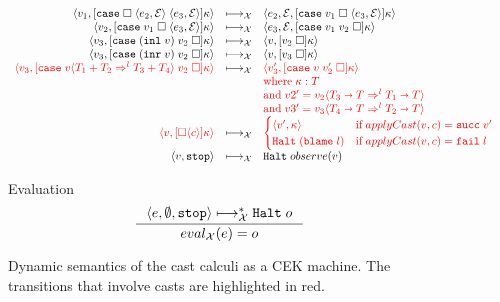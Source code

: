 \documentclass[acmsmall,review]{acmart}\settopmatter{printfolios=true,printccs=false,printacmref=false}
\newcommand{\plus}[0]{+}
\newcommand{\sOOinspect}[3]{\langle#1,#2,#3\rangle}
\newcommand{\sOOreturn}[2]{\langle#1,#2\rangle}
\newcommand{\sOOhalt}[1]{\mathtt{Halt} \; #1}
\newcommand{\POOfun}[2]{#1 \shortrightarrow #2}
\newcommand{\POOprod}[2]{#1 \times #2}
\newcommand{\POOsum}[2]{#1 \plus #2}
\newcommand{\cOOcast}[3]{#1 \Rightarrow^{#2} #3}
\newcommand{\oOOblame}[1]{\mathtt{blame} \; #1}
\newcommand{\vOOcast}[2]{#1\langle#2\rangle}
\newcommand{\vOOinl}[1]{\mathtt{inl}\;#1}
\newcommand{\vOOinr}[1]{\mathtt{inr}\;#1}
\newcommand{\rOOsucc}[1]{\mathtt{succ}\;#1}
\newcommand{\rOOfail}[1]{\mathtt{fail}\;#1}
\newcommand{\kOOmt}[0]{\mathtt{stop}}
\newcommand{\kOOconsI}[5]{
	[\mathtt{cons}^{\POOprod{#1}{#2}} \; \square \; \langle#3,#4\rangle ]#5}
\newcommand{\kOOappII}[2]{
  [#1 \; \square]#2}
\newcommand{\kOOcaseI}[4]{
  [\mathtt{case} \; \square \; \langle#1,#3\rangle \; \langle#2,#3\rangle ]#4}
\newcommand{\kOOcaseII}[4]{
  [\mathtt{case} \; #1 \; \square \; \langle#2,#3\rangle ]#4}
\newcommand{\kOOcaseIII}[3]{
  [\mathtt{case} \; #1 \; #2 \; \square]#3}
\newcommand{\kOOcast}[2]{
  [\square \langle #1 \rangle]#2}
\newcommand{\hckOOmt}[0]{\mathtt{stop}}
\newcommand{\sidecond}[1]{\text{if}\;#1}
\newcommand{\judgeCreduceTrans}[2]{#1 \longmapsto_{\mathcal{X}}^{*} #2}
\newcommand{\judgeCeval}[2]{eval_{\mathcal{X}}(#1) = #2}
\newcommand{\redrule}[3]{#1 & \longmapsto_\mathcal{X} & #2 & #3\\}
\newcommand{\highlight}[1]{{\color{red} #1}}
\begin{document}
\begin{figure}
\[\begin{array}{rclr}
\redrule{
\sOOreturn{v_1}{\kOOcaseI{e_2}{e_3}{\mathcal{E}}{\kappa}}}{
\sOOinspect{e_2}{\mathcal{E}}{\kOOcaseII{v_1}{e_3}{\mathcal{E}}{\kappa}}}{}

\redrule{
\sOOreturn{v_2}{\kOOcaseII{v_1}{e_3}{\mathcal{E}}{\kappa}}}{
\sOOinspect{e_3}{\mathcal{E}}{
  \kOOcaseIII{v_1}{v_2}{\kappa}
}}{}  

\redrule{
\sOOreturn{v_3}{
  \kOOcaseIII{(\vOOinl{v})}{v_2}{\kappa}
}
}{
\sOOreturn{v}{\kOOappII{v_2}{\kappa}}
}{}

\redrule{
  \sOOreturn{v_3}{
    \kOOcaseIII{(\vOOinr{v})}{v_2}{\kappa}
  }
}{
\sOOreturn{v}{\kOOappII{v_3}{\kappa}}
}{}

\redrule{
  \highlight{\sOOreturn{v_3}{
    \kOOcaseIII{
        \vOOcast{v}{\cOOcast{\POOsum{T_1}{T_2}}{l}{\POOsum{T_3}{T_4}}}
      }{v_2}{\kappa}
  }}
}{
  \highlight{\sOOreturn{v_3'}{
      \kOOcaseIII{v}{v_2'}{\kappa}
  }}
}{\\&&
\highlight{\text{where}\;
	\kappa:T
}
\\&&
\highlight{\text{and}\;
v2' = \vOOcast{v_2}{\cOOcast{\POOfun{T_3}{T}}{l}{\POOfun{T_1}{T}}}}
\\&&
\highlight{\text{and}\;
v3' = \vOOcast{v_3}{\cOOcast{\POOfun{T_4}{T}}{l}{\POOfun{T_2}{T}}}}
}
  
  \redrule{
    \highlight{\sOOreturn{v}{
        \kOOcast{c}{\kappa}
      }}
  }{
\highlight{          
\begin{cases}
  \sOOreturn{v'}{\kappa} & \sidecond{applyCast(v,c) = \rOOsucc{v'}}
  \\
  \sOOhalt{(\oOOblame{l})} & \sidecond{applyCast(v,c) = \rOOfail{l}}
\end{cases}}
  }{}
\redrule{
\sOOreturn{v}{\kOOmt}}{
\sOOhalt{observe(v)}}{}
  \end{array}
  \]  
  
  Evaluation \fbox{$\judgeCeval{e}{o}$}
  \[
  \inference{
    \judgeCreduceTrans{
      \sOOinspect{e}{\emptyset}{\hckOOmt}
    }{\sOOhalt{o}}    
  }{
    \judgeCeval{e}{o}
  }
  \]
  
  \caption{Dynamic semantics of the cast calculi as a CEK
          machine. The transitions that involve casts are highlighted
          in red.}
  \label{fig:machine-cekc}
\end{figure}

\end{document}
